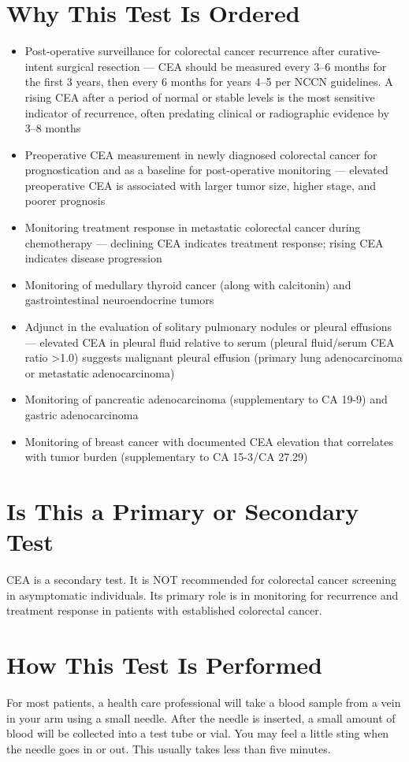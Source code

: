 \section*{Why This Test Is Ordered}
\begin{itemize}
  \item Post-operative surveillance for colorectal cancer recurrence after curative-intent surgical resection --- CEA should be measured every 3--6 months for the first 3 years, then every 6 months for years 4--5 per NCCN guidelines. A rising CEA after a period of normal or stable levels is the most sensitive indicator of recurrence, often predating clinical or radiographic evidence by 3--8 months
  \item Preoperative CEA measurement in newly diagnosed colorectal cancer for prognostication and as a baseline for post-operative monitoring --- elevated preoperative CEA is associated with larger tumor size, higher stage, and poorer prognosis
  \item Monitoring treatment response in metastatic colorectal cancer during chemotherapy --- declining CEA indicates treatment response; rising CEA indicates disease progression
  \item Monitoring of medullary thyroid cancer (along with calcitonin) and gastrointestinal neuroendocrine tumors
  \item Adjunct in the evaluation of solitary pulmonary nodules or pleural effusions --- elevated CEA in pleural fluid relative to serum (pleural fluid/serum CEA ratio >1.0) suggests malignant pleural effusion (primary lung adenocarcinoma or metastatic adenocarcinoma)
  \item Monitoring of pancreatic adenocarcinoma (supplementary to CA 19-9) and gastric adenocarcinoma
  \item Monitoring of breast cancer with documented CEA elevation that correlates with tumor burden (supplementary to CA 15-3/CA 27.29)
\end{itemize}

\section*{Is This a Primary or Secondary Test}
CEA is a secondary test. It is NOT recommended for colorectal cancer screening in asymptomatic individuals. Its primary role is in monitoring for recurrence and treatment response in patients with established colorectal cancer.

\section*{How This Test Is Performed}
For most patients, a health care professional will take a blood sample from a vein in your arm using a small needle. After the needle is inserted, a small amount of blood will be collected into a test tube or vial. You may feel a little sting when the needle goes in or out. This usually takes less than five minutes.


